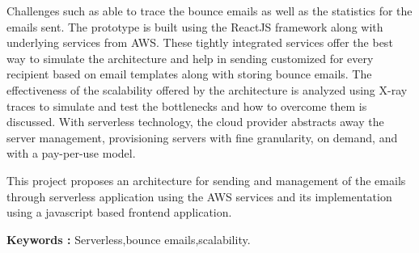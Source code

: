 \vspace{0.2cm}
\noindent
Challenges such as able to trace the bounce emails as well as the statistics for the emails sent. The prototype is built using the ReactJS framework along with underlying services from AWS. These tightly integrated services offer the best way to simulate the architecture and help in sending customized for every recipient based on email templates along with storing bounce emails. The effectiveness of the scalability offered by the architecture is analyzed using X-ray traces to simulate and test the bottlenecks and how to overcome them is discussed. With serverless technology, the cloud provider abstracts away the server management, provisioning servers with fine granularity, on demand, and with a pay-per-use model\cite{eismann2020serverless}. \par


\vspace{0.2cm}
\noindent
This project proposes an architecture for sending and management of the emails through serverless application using the AWS services and its implementation using a javascript based frontend application.

\par
\vspace{0.1cm}
\noindent
\textbf{Keywords :} Serverless,bounce emails,scalability.
